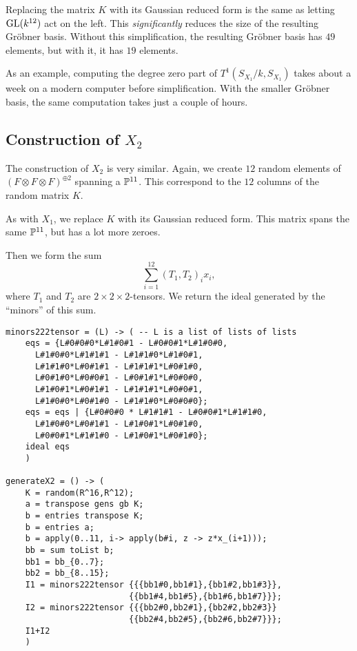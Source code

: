 \begin{remark}
Replacing the matrix $K$ with its Gaussian reduced form is the same as letting $\GL(k^{12})$ act on the left. This \emph{significantly} reduces the size of the resulting Gröbner basis. Without this simplification, the resulting Gröbner basis has $49$ elements, but with it, it has $19$ elements.

As an example, computing the degree zero part of $T^1(S_{X_1}/k,S_{X_1})$ takes about a week on a modern computer before simplification. With the smaller Gröbner basis, the same computation takes just a couple of hours.
\end{remark}

\subsection{Construction of $X_2$}

The construction of $X_2$ is very similar. Again, we create $12$ random elements of $\left(F \otimes F \otimes F \right)^{\oplus 2}$ spanning a $\P^{11}$. This correspond to the $12$ columns of the random matrix $K$.

As with $X_1$, we replace $K$ with its Gaussian reduced form. This matrix spans the same $\P^{11}$, but has a lot more zeroes.

Then we form the sum
\[
\sum_{i=1}^{12} (T_1,T_2)_i x_i,
\]
where $T_1$ and $T_2$ are $2 \times 2 \times 2$-tensors. We return the ideal generated by the ``minors'' of this sum.

\begin{minipage}{\linewidth}
\begin{lstlisting}[caption=Code for $X_2$, language=Macaulay2]
minors222tensor = (L) -> ( -- L is a list of lists of lists
    eqs = {L#0#0#0*L#1#0#1 - L#0#0#1*L#1#0#0,
      L#1#0#0*L#1#1#1 - L#1#1#0*L#1#0#1,
      L#1#1#0*L#0#1#1 - L#1#1#1*L#0#1#0,
      L#0#1#0*L#0#0#1 - L#0#1#1*L#0#0#0,
      L#1#0#1*L#0#1#1 - L#1#1#1*L#0#0#1,
      L#1#0#0*L#0#1#0 - L#1#1#0*L#0#0#0};
    eqs = eqs | {L#0#0#0 * L#1#1#1 - L#0#0#1*L#1#1#0,
      L#1#0#0*L#0#1#1 - L#1#0#1*L#0#1#0,
      L#0#0#1*L#1#1#0 - L#1#0#1*L#0#1#0};
    ideal eqs
    )

generateX2 = () -> (
    K = random(R^16,R^12);
    a = transpose gens gb K;
    b = entries transpose K;
    b = entries a;
    b = apply(0..11, i-> apply(b#i, z -> z*x_(i+1)));
    bb = sum toList b;
    bb1 = bb_{0..7};
    bb2 = bb_{8..15};
    I1 = minors222tensor {{{bb1#0,bb1#1},{bb1#2,bb1#3}},
                         {{bb1#4,bb1#5},{bb1#6,bb1#7}}};
    I2 = minors222tensor {{{bb2#0,bb2#1},{bb2#2,bb2#3}}
                         {{bb2#4,bb2#5},{bb2#6,bb2#7}}};
    I1+I2
    )
\end{lstlisting}
\end{minipage}

